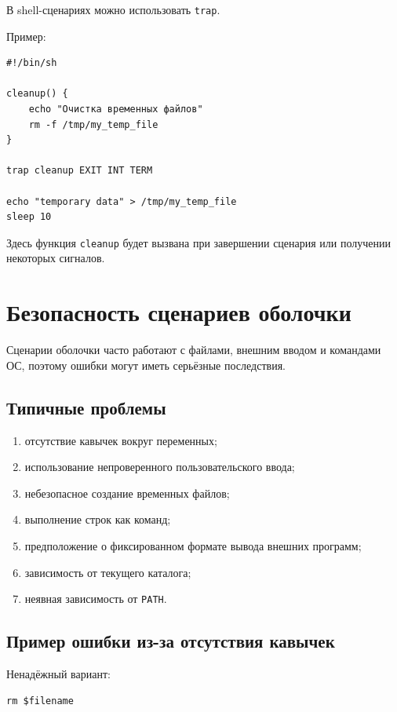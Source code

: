 \documentclass[12pt,a4paper]{article}
\begin{document}
В shell-сценариях можно использовать \texttt{trap}.

Пример:

\begin{lstlisting}
#!/bin/sh

cleanup() {
    echo "Очистка временных файлов"
    rm -f /tmp/my_temp_file
}

trap cleanup EXIT INT TERM

echo "temporary data" > /tmp/my_temp_file
sleep 10
\end{lstlisting}

Здесь функция \texttt{cleanup} будет вызвана при завершении сценария или получении некоторых сигналов.

\section{Безопасность сценариев оболочки}

Сценарии оболочки часто работают с файлами, внешним вводом и командами ОС, поэтому ошибки могут иметь серьёзные последствия.

\subsection{Типичные проблемы}

\begin{enumerate}
    \item отсутствие кавычек вокруг переменных;
    \item использование непроверенного пользовательского ввода;
    \item небезопасное создание временных файлов;
    \item выполнение строк как команд;
    \item предположение о фиксированном формате вывода внешних программ;
    \item зависимость от текущего каталога;
    \item неявная зависимость от \texttt{PATH}.
\end{enumerate}

\subsection{Пример ошибки из-за отсутствия кавычек}

Ненадёжный вариант:

\begin{lstlisting}
rm $filename
\end{lstlisting}
\end{document}
